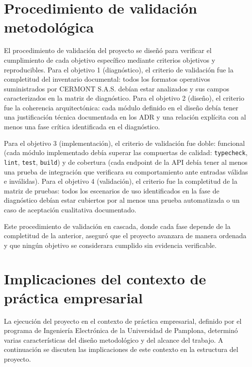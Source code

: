 \section{Procedimiento de validación metodológica}
\label{sec:procedimiento-validacion}

El procedimiento de validación del proyecto se diseñó para verificar el cumplimiento de cada objetivo específico mediante criterios objetivos y reproducibles. Para el objetivo 1 (diagnóstico), el criterio de validación fue la completitud del inventario documental: todos los formatos operativos suministrados por CERMONT S.A.S. debían estar analizados y sus campos caracterizados en la matriz de diagnóstico. Para el objetivo 2 (diseño), el criterio fue la coherencia arquitectónica: cada módulo definido en el diseño debía tener una justificación técnica documentada en los ADR y una relación explícita con al menos una fase crítica identificada en el diagnóstico.

Para el objetivo 3 (implementación), el criterio de validación fue doble: funcional (cada módulo implementado debía superar las compuertas de calidad: \texttt{typecheck}, \texttt{lint}, \texttt{test}, \texttt{build}) y de cobertura (cada endpoint de la API debía tener al menos una prueba de integración que verificara su comportamiento ante entradas válidas e inválidas). Para el objetivo 4 (validación), el criterio fue la completitud de la matriz de pruebas: todos los escenarios de uso identificados en la fase de diagnóstico debían estar cubiertos por al menos una prueba automatizada o un caso de aceptación cualitativa documentado.

Este procedimiento de validación en cascada, donde cada fase depende de la completitud de la anterior, aseguró que el proyecto avanzara de manera ordenada y que ningún objetivo se considerara cumplido sin evidencia verificable.

\section{Implicaciones del contexto de práctica empresarial}
\label{sec:modalidad-practica}

La ejecución del proyecto en el contexto de práctica empresarial, definido por el programa de Ingeniería Electrónica de la Universidad de Pamplona, determinó varias características del diseño metodológico y del alcance del trabajo. A continuación se discuten las implicaciones de este contexto en la estructura del proyecto.

